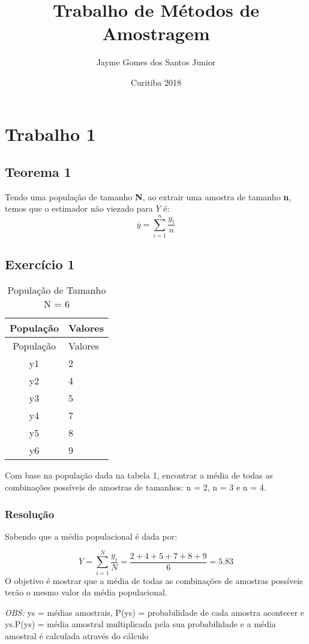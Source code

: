 \documentclass[]{article}
\title{Trabalho de Métodos de Amostragem}
\author{Jayme Gomes dos Santos Junior}
\date{Curitiba 2018}
\begin{document}
\maketitle

{
\setcounter{tocdepth}{3}
\tableofcontents
}
\newpage

\section{Trabalho 1}\label{trabalho-1}

\subsection{Teorema 1}\label{teorema-1}

Tendo uma população de tamanho \textbf{N}, ao extrair uma amostra de
tamanho \textbf{n}, temos que o estimador não viezado para
\(\overline{Y}\) é: \[
\overline{y} = \sum_{i=1}^n\dfrac{y_i}{n}
\]

\subsection{Exercício 1}\label{exercicio-1}

\begin{longtable}[]{@{}cl@{}}
\caption{População de Tamanho N = 6}\tabularnewline
\toprule
População & Valores\tabularnewline
\midrule
\endfirsthead
\toprule
População & Valores\tabularnewline
\midrule
\endhead
y1 & 2\tabularnewline
y2 & 4\tabularnewline
y3 & 5\tabularnewline
y4 & 7\tabularnewline
y5 & 8\tabularnewline
y6 & 9\tabularnewline
\bottomrule
\end{longtable}

Com base na população dada na tabela 1, encontrar a média de todas as
combinações possíveis de amostras de tamanhos: n = 2, n = 3 e n = 4.

\subsubsection{Resolução}\label{resolucao}

Sabendo que a média populacional é dada por:

\[
\overline{Y} = \sum_{i=1}^N\dfrac{y_i}{N} = \dfrac{2+4+5+7+8+9}{6} = 5.83
\] O objetivo é mostrar que a média de todas as combinações de amostras
possíveis terão o mesmo valor da média populacional.

\emph{OBS:} ys = médias amostrais, P(ys) = probabilidade de cada amostra
acontecer e ys.P(ys) = média amostral multiplicada pela sua
probabilidade e a média amostral é calculada através do cálculo
\end{document}
